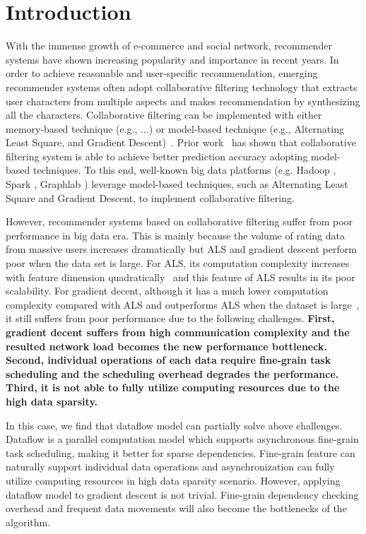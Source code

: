 \documentclass{llncs}
\begin{document}
\vspace{-30pt}
\section{Introduction}
\vspace{-5pt}

With the immense growth of e-commerce and social network, recommender systems have shown increasing popularity and importance in recent years.
In order to achieve reasonable and user-specific recommendation, emerging recommender systems often adopt collaborative filtering technology that  extracts user characters from multiple aspects and makes recommendation by synthesizing all the characters. Collaborative filtering  can be implemented with either memory-based technique (e.g., ...) or model-based technique (e.g., Alternating Least Square, and Gradient Descent)~\cite{MemoryBasedCF}. Prior work~\cite{MF2009,recSurvey2013} has shown that collaborative filtering system is able to achieve better prediction accuracy adopting model-based techniques. To this end, well-known big data platforms (e.g. Hadoop \cite{Hadoop}, Spark \cite{SparkMllib}, Graphlab \cite{graphlab}) leverage model-based techniques, such as Alternating Least Square and Gradient Descent, to implement collaborative filtering.

However, recommender systems based on collaborative filtering suffer from poor performance in big data era. This is mainly because the volume of rating data from massive users increases dramatically but ALS and gradient descent perform poor when the data set is large. 
For ALS, its computation complexity increases with feature dimension quadratically~\cite{ibm2011} and this feature of ALS results in its poor scalability. For gradient decent, although it has a much lower computation complexity compared with ALS and outperforms ALS when the dataset is large~\cite{sgdKdd2015,sgdFast2015,ibm2011}, it still suffers from poor performance due to the following challenges. 
\textbf{First, gradient decent suffers from high communication complexity and the resulted network load becomes the new performance bottleneck. Second, individual operations of each data require fine-grain task scheduling and the scheduling overhead degrades the performance. Third, it is not able to fully utilize computing resources due to the high data sparsity.}

In this case, we find that dataflow model can partially solve above challenges.
Dataflow \cite{dataflow} is a parallel computation model which
supports asynchronous fine-grain task scheduling, making it
better for sparse dependencies. Fine-grain feature can naturally support individual data operations and asynchronization can fully utilize computing resources in high data sparsity scenario. However, applying dataflow model to gradient descent is not trivial. Fine-grain dependency checking overhead and frequent data movements will also become the bottlenecks of the algorithm.
\end{document}
